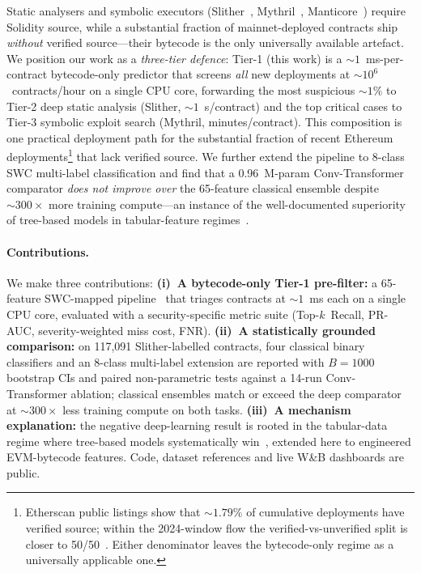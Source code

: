 \documentclass[twocolumn, 10pt]{article}
\begin{document}
Static analysers and symbolic executors (Slither~\cite{slither},
Mythril~\cite{mythril}, Manticore~\cite{manticore}) require Solidity
source, while a substantial fraction of mainnet-deployed contracts
ship \emph{without} verified source---their bytecode is the only
universally available artefact. We position our work as a
\emph{three-tier defence}: Tier-1 (this work) is a
$\sim\!1$~ms-per-contract bytecode-only predictor that screens
\emph{all} new deployments at $\sim\!10^{6}$~contracts/hour on a
single CPU core, forwarding the most suspicious $\sim\!1\%$ to Tier-2
deep static analysis (Slither, $\sim\!1$~s/contract) and the top
critical cases to Tier-3 symbolic exploit search (Mythril,
minutes/contract). This composition is one practical deployment path
for the substantial fraction of recent Ethereum
deployments\footnote{Etherscan public listings show
that ${\sim}1.79\%$ of cumulative deployments have verified source;
within the 2024-window flow the verified-vs-unverified split is
closer to 50/50~\cite{cobra,scannerstudy}. Either denominator leaves
the bytecode-only regime as a universally applicable one.}
that lack verified source. We further extend the
pipeline to 8-class SWC multi-label classification and find that a
0.96~M-param Conv-Transformer comparator \emph{does not improve over}
the 65-feature classical ensemble despite $\sim\!300\times$ more
training compute---an instance of the well-documented superiority of
tree-based models in tabular-feature
regimes~\cite{grinsztajn2022,shwartz2022}.

\paragraph{Contributions.}
We make three contributions:
\textbf{(i)~A bytecode-only Tier-1 pre-filter:} a 65-feature
SWC-mapped pipeline~\cite{swcRegistry} that triages contracts at
${\sim}1$~ms each on a single CPU core, evaluated with a
security-specific metric suite (Top-$k$~Recall, PR-AUC,
severity-weighted miss cost, FNR).
\textbf{(ii)~A statistically grounded comparison:} on 117{,}091
Slither-labelled contracts, four classical binary classifiers and an
8-class multi-label extension are reported with $B\!=\!1000$
bootstrap CIs and paired non-parametric tests against a 14-run
Conv-Transformer ablation; classical ensembles match or exceed the
deep comparator at ${\sim}300{\times}$ less training compute on both
tasks.
\textbf{(iii)~A mechanism explanation:} the negative deep-learning
result is rooted in the tabular-data regime where tree-based models
systematically win~\cite{grinsztajn2022,shwartz2022}, extended here
to engineered EVM-bytecode features. Code, dataset references and
live W\&B dashboards are public.
\end{document}
